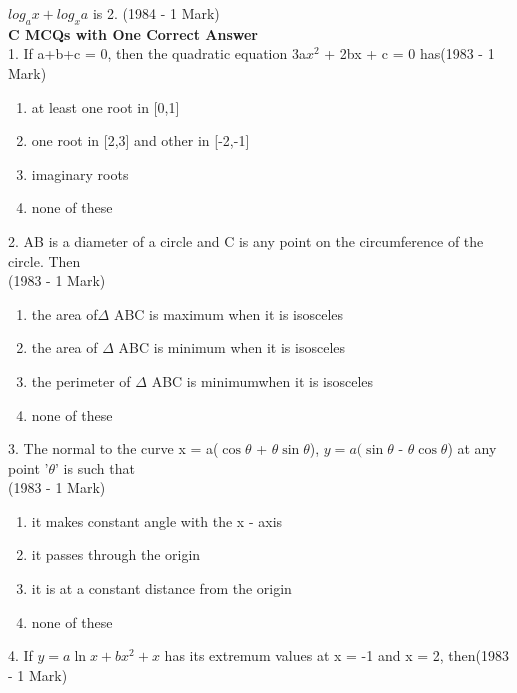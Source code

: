 \documentclass[journal,12pt,twocolumn]{IEEEtran}
\theoremstyle{remark}
\begin{document}
$log_a x + log_x a$ is 2. \hspace{2.3cm}(1984 - 1 Mark)\\[6pt]
\indent\hspace{0.3cm}\textbf{C MCQs with One Correct Answer}\\[6pt]
1.  If a+b+c = 0, then the quadratic equation 3a$x^2$ \indent + 2bx + c = 0 
has\hspace{2.2cm}(1983 - 1 Mark)\\
\begin{enumerate}[label=\alph*.]
	\item at least one root in [0,1]
	\item one root in [2,3] and other in [-2,-1]
        \item imaginary roots
	\item none of these\\[3pt]
\end{enumerate}
2.  AB is a diameter of a circle and C is any point \indent on the
circumference of the circle. Then\\[2pt]\indent\hspace{5.4cm} 
(1983 - 1 Mark)\\
\begin{enumerate}[label=\alph*.]
	\item the area of$\Delta$ ABC is maximum when it is isosceles
	\item the area of $\Delta$ ABC is minimum when it is isosceles
	\item the perimeter of $\Delta$ ABC is minimumwhen it is isosceles
	\item none of these\\[3pt]
\end{enumerate}
3.  The normal to the curve x = a($\cos \theta$ + $\theta\sin \theta$),
\indent $y = a(\sin \theta$ - $\theta\cos \theta$) at any point '$\theta$' 
is such that\\[2pt]\indent\hspace{5.4cm}(1983 - 1 Mark)
\begin{enumerate}[label=\alph*.]
	\item it makes  constant angle with the x - axis
	\item it passes through the origin
	\item it is at a constant distance from the origin
	\item none of these
\end{enumerate}
4.  If $y=a\ln x + bx^2 +x$ has its extremum values at \indent x = -1
and x = 2, then\hspace{1.6cm}(1983 - 1 Mark)
\end{document}
